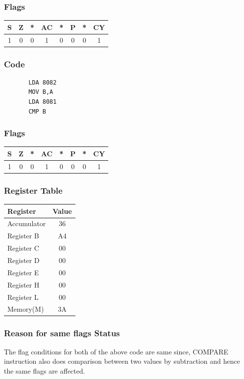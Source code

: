 \documentclass[]{report}
\begin{document}
\subsubsection{Flags}
\begin{tabular}{cccccccc}
\hline
    S & Z & *  & AC & *  & P & *  & CY  \\
    \hline
    1&0&0&1&0&0&0&1 \\
    \hline
\end{tabular}
\subsubsection{Code}
\begin{verbatim}
	   LDA 8082
	   MOV B,A
	   LDA 8081
	   CMP B
\end{verbatim}
\subsubsection{Flags}
\begin{tabular}{cccccccc}
\hline
    S & Z & *  & AC & *  & P & *  & CY  \\
    \hline
    1&0&0&1&0&0&0&1 \\
    \hline
\end{tabular}
\subsubsection {Register Table}
\begin{tabular}{lc}
    \hline
    Register & Value\\
    \hline
    Accumulator     & 36        \\
    Register B      & A4        \\
    Register C      &  00        \\
    Register D      &   00       \\
    Register E      &   00       \\
    Register H      &  00        \\
    Register L      &  00         \\
    Memory(M)       &      3A         \\
    \hline
\end{tabular}
\subsubsection {Reason for same flags Status}
The flag conditions for both of the above code are same since, COMPARE instruction also does comparison between two values  by subtraction and hence the same flags are affected.
\end{document}
